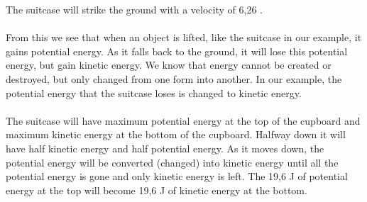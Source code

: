The suitcase will strike the ground with a velocity of 6,26 \ms.\\
\\
From this we see that when an object is lifted, like the suitcase in our example, it gains potential energy. As it falls back to the ground, it will lose this potential energy, but gain kinetic energy. We know that energy cannot be created or destroyed, but only changed from one form into another. In our example, the potential energy that the suitcase loses is changed to kinetic energy. \\
\\
The suitcase will have maximum potential energy at the top of the cupboard and maximum kinetic energy at the bottom of the cupboard. Halfway down it will have half kinetic energy and half potential energy. As it moves down, the potential energy will be converted (changed) into kinetic energy until all the potential energy is gone and only kinetic energy is left. The 19,6 J of potential energy at the top will become 19,6 J of kinetic energy at the bottom.\\

